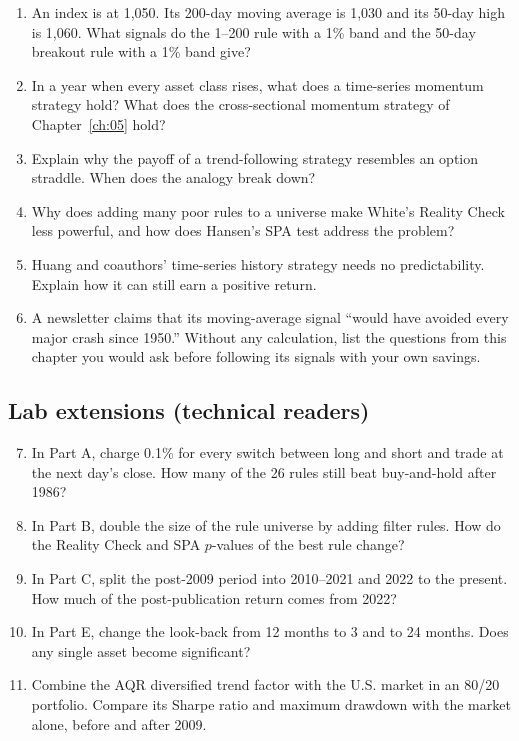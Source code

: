 \begin{enumerate}
  \item An index is at 1,050. Its 200-day moving average is 1,030 and its 50-day high is 1,060. What signals do the 1--200 rule with a 1\% band and the 50-day breakout rule with a 1\% band give?
  \item In a year when every asset class rises, what does a time-series momentum strategy hold? What does the cross-sectional momentum strategy of Chapter~\ref{ch:05} hold?
  \item Explain why the payoff of a trend-following strategy resembles an option straddle. When does the analogy break down?
  \item Why does adding many poor rules to a universe make White's Reality Check less powerful, and how does Hansen's SPA test address the problem?
  \item Huang and coauthors' time-series history strategy needs no predictability. Explain how it can still earn a positive return.
  \item A newsletter claims that its moving-average signal ``would have avoided every major crash since 1950.'' Without any calculation, list the questions from this chapter you would ask before following its signals with your own savings.
\end{enumerate}

\subsection*{Lab extensions (technical readers)}

\begin{enumerate}
  \setcounter{enumi}{6}
  \item In Part A, charge 0.1\% for every switch between long and short and trade at the next day's close. How many of the 26 rules still beat buy-and-hold after 1986?
  \item In Part B, double the size of the rule universe by adding filter rules. How do the Reality Check and SPA $p$-values of the best rule change?
  \item In Part C, split the post-2009 period into 2010--2021 and 2022 to the present. How much of the post-publication return comes from 2022?
  \item In Part E, change the look-back from 12 months to 3 and to 24 months. Does any single asset become significant?
  \item Combine the AQR diversified trend factor with the U.S. market in an 80/20 portfolio. Compare its Sharpe ratio and maximum drawdown with the market alone, before and after 2009.
\end{enumerate}
